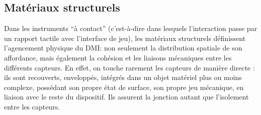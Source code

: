 \subsection{Matériaux structurels}

\noindent Dans les instruments ``à contact'' (c'est-à-dire dans lesquels l'interaction passe par un rapport tactile avec l'interface de jeu), les matériaux structurels définissent l'agencement physique du \gls{DMI}: non seulement la distribution spatiale de son affordance, mais également la cohésion et les liaisons mécaniques entre les différents capteurs. En effet, on touche rarement les capteurs de manière directe : ils sont recouverts, enveloppés, intégrés dans un objet matériel plus ou moins complexe, possédant son propre état de surface, son propre jeu mécanique, en liaison avec le reste du dispositif. Ils assurent la jonction autant que l'isolement entre les capteurs.
\vspace{-1em}
